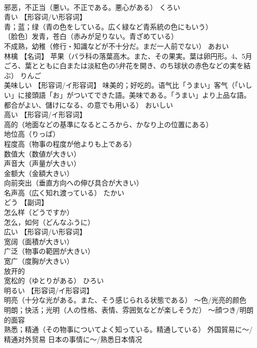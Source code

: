 \documentclass[8pt]{extreport}
\begin{document}
\begin{CJK}{UTF8}{min}
\\	邪恶，不正当（悪い。不正である。悪心がある）	くろい	
\\	青い	【形容词/い形容词】 
\\	青；蓝；绿（青の色をしている。広く緑など青系統の色にもいう） 
\\	〔脸色〕发青，苍白（赤みが足りない。青ざめている） 
\\	不成熟，幼稚（修行・知識などが不十分だ。まだ一人前でない）	あおい	
\\	林檎	【名词】 苹果（バラ科の落葉高木。また、その果実。葉は卵円形。4、5月ごろ、葉とともに白または淡紅色の5弁花を開き、のち球状の赤色などの実を結ぶ）	りんご	
\\	美味しい	【形容词/イ形容词】 味美的；好吃的。语气比「うまい」客气（「いしい」に接頭語「お」がついてできた語。美味である。「うまい」より上品な語。都合がよい、儲けになる、の意でも用いる）	おいしい	
\\	高い	【形容词/イ形容词】 
\\	高的（地面などの基準になるところから、かなり上の位置にある） 
\\	地位高（りっぱ） 
\\	程度高（物事の程度が他よりも上である） 
\\	数值大（数値が大きい） 
\\	声音大（声量が大きい） 
\\	金额大（金額大きい） 
\\	向前突出（垂直方向への伸び具合が大きい） 
\\	名声高（広く知れ渡っている）	たかい	
\\	どう	【副词】 
\\	怎么样（どうですか） 
\\	怎么，如何（どんなふうに）		
\\	広い	【形容词/い形容词】 
\\	宽阔（面積が大きい） 
\\	广泛（物事の範囲が大きい） 
\\	宽广（度胸が大きい） 
\\	放开的 
\\	宽松的（ゆとりがある）	ひろい	
\\	明るい	【形容词/イ形容词】 
\\	明亮（十分な光がある。また、そう感じられる状態である） 〜色/光亮的颜色 
\\	明朗；快活；光明（人の性格、表情、雰囲気などが楽しそうだ） 〜顔つき/明朗的面容 
\\	熟悉；精通（その物事についてよく知っている。精通している） 外国貿易に〜/精通对外贸易 日本の事情に〜/熟悉日本情况 

\end{CJK}
\end{document}
